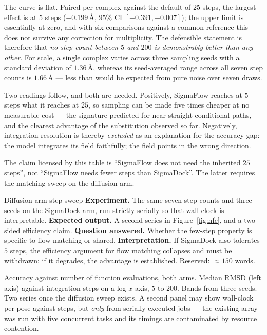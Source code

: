 The curve is flat. Paired per complex against the default of $25$ steps, the
largest effect is at $5$ steps ($-0.199$\,\AA, $95\%$ CI $[-0.391, -0.007]$);
the upper limit is essentially at zero, and with six comparisons against a
common reference this does not survive any correction for multiplicity. The
defensible statement is therefore that \emph{no step count between $5$ and
$200$ is demonstrably better than any other}. For scale, a single complex
varies across three sampling seeds with a standard deviation of $1.36$\,\AA,
whereas its seed-averaged range across all seven step counts is $1.66$\,\AA{}
--- less than would be expected from pure noise over seven draws.

Two readings follow, and both are needed. Positively, SigmaFlow reaches at $5$
steps what it reaches at $25$, so sampling can be made five times cheaper at no
measurable cost --- the signature predicted for near-straight conditional
paths, and the clearest advantage of the substitution observed so far.
Negatively, integration resolution is thereby \emph{excluded} as an
explanation for the accuracy gap: the model integrates its field faithfully;
the field points in the wrong direction.

The claim licensed by this table is ``SigmaFlow does not need the inherited
$25$ steps'', not ``SigmaFlow needs fewer steps than SigmaDock''. The latter
requires the matching sweep on the diffusion arm.

\begin{reserved}{Diffusion-arm step sweep}
\textbf{Experiment.} The same seven step counts and three seeds on the
SigmaDock arm, run strictly serially so that wall-clock is interpretable.
\textbf{Expected output.} A second series in Figure~\ref{fig:nfe}, and a
two-sided efficiency claim. \textbf{Question answered.} Whether the
few-step property is specific to flow matching or shared.
\textbf{Interpretation.} If SigmaDock also tolerates $5$ steps, the efficiency
argument for flow matching collapses and must be withdrawn; if it degrades,
the advantage is established. Reserved: \(\approx 150\) words.
\end{reserved}

{Accuracy against number of function evaluations, both arms.}
{Median RMSD (left axis) against integration steps on a log $x$-axis, $5$ to
$200$. Bands from three seeds. Two series once the diffusion sweep exists.
A second panel may show wall-clock per pose against steps, but \emph{only}
from serially executed jobs --- the existing array was run with five
concurrent tasks and its timings are contaminated by resource contention.}

